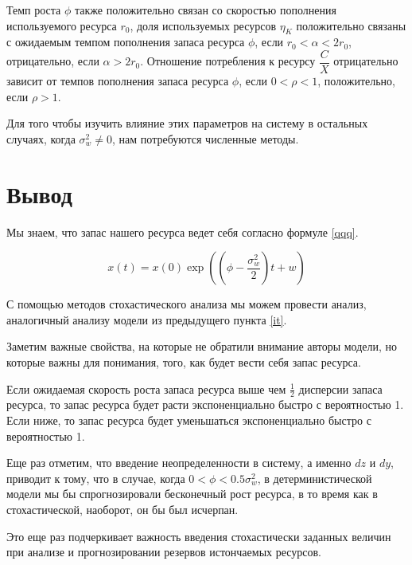 \documentclass[12pt,a4paper, oneside]{extreport}
\begin{document}
Темп роста $ \phi $ также положительно связан со скоростью пополнения используемого ресурса $ r_0 $,    доля используемых ресурсов $ \eta_K $  положительно связаны с ожидаемым темпом пополнения запаса ресурса $ \phi $, если $  r_0 < \alpha < 2r_0 $, отрицательно, если $  \alpha > 2r_0 $. Отношение потребления к ресурсу   $ \dfrac{C}{X} $  отрицательно зависит от   темпов пополнения запаса ресурса $ \phi $, если $  0 < \rho  < 1  $, положительно, если $  \rho  > 1  $.


Для того чтобы изучить влияние этих параметров на систему в остальных случаях, когда  $ \sigma_{w}^2 \neq 0 $,     нам потребуются  численные методы.  
 
 
 
\section{ Вывод} 
 
 Мы знаем, что запас нашего ресурса ведет себя согласно формуле \eqref{qqq}.  
 
 \begin{equation*}\label{qqq}
 x(t) =  x(0) \exp \left(    \left(  \phi - \dfrac{\sigma^2_w}{2} \right)    t +  w  \right) 
 \end{equation*}
 
 
 С помощью методов стохастического анализа мы можем провести анализ, аналогичный анализу модели  из  предыдущего пункта \eqref{it}. 
 
 Заметим важные свойства, на которые не обратили внимание авторы модели, но которые важны для понимания, того, как будет вести себя запас ресурса. 
 
 Если ожидаемая скорость роста запаса ресурса  выше чем $ \frac{1}{2} $ дисперсии запаса  ресурса,  то запас ресурса  будет расти экспоненциально быстро с вероятностью 1.   Если ниже, то запас ресурса  будет уменьшаться  экспоненциально быстро с вероятностью 1.
 
 Еще раз отметим, что введение неопределенности в систему, а именно $ dz $ и $  dy  $,    приводит к тому, что  в    случае, когда $ 0 < \phi <  0.5 \sigma^2_w  $,   в детерминистической модели мы бы спрогнозировали    бесконечный рост ресурса,  в то время как в стохастической, наоборот,  он бы был исчерпан.  
 
 Это еще раз подчеркивает важность введения стохастически заданных величин при    анализе и прогнозировании резервов истончаемых ресурсов.  
 
 
 
\end{document}
